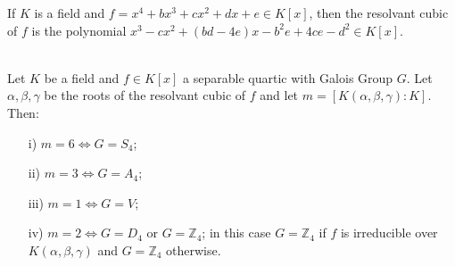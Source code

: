 \begin{remark} If \(K\) is a field and \(f = x^4+bx^3+cx^2+dx+e \in K[x]\), then the resolvant cubic of \(f\) is the polynomial \(x^3-cx^2+(bd-4e)x-b^2e+4ce-d^2 \in K[x]\).\\ \\
\end{remark}

\begin{theorem}
  Let \(K\) be a field and \(f \in K[x]\) a separable quartic with Galois Group \(G\). Let \(\alpha, \beta, \gamma\) be the roots of the resolvant cubic of \(f\) and let \(m= [K(\alpha, \beta, \gamma) : K]\). Then:
\begin{enumerate}
\item[i)] \(m=6 \Longleftrightarrow G=S_4\);
\item[ii)] \(m=3 \Longleftrightarrow G=A_4\);
\item[iii)] \(m=1 \Longleftrightarrow G=V\);
  \item[iv)] \(m=2 \Longleftrightarrow G=D_4\) or \(G={\mathbb{Z}}_4\); in this case \(G={\mathbb{Z}}_4\) if \(f\) is irreducible over \(K(\alpha, \beta, \gamma)\) and \(G={\mathbb{Z}}_4\) otherwise.
  \end{enumerate}
\end{theorem}









